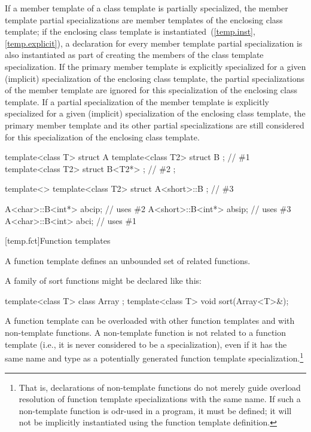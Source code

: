 \pnum
If a member template of a class template is partially specialized,
the member template partial specializations are member templates of
the enclosing class template;
if the enclosing class template is instantiated~(\ref{temp.inst}, \ref{temp.explicit}),
a declaration for every member template partial specialization is also
instantiated as part of creating the members of the class template
specialization.
If the primary member template is explicitly specialized for a given
(implicit) specialization of the enclosing class template,
the partial specializations of the member template are ignored for this
specialization of the enclosing class template.
If a partial specialization of the member template is explicitly specialized
for a given (implicit) specialization of the enclosing class template,
the primary member template and its other partial specializations are
still considered for this specialization of the enclosing class template.
\begin{example}

\begin{codeblock}
template<class T> struct A {
  template<class T2> struct B {};                     // \#1
  template<class T2> struct B<T2*> {};                // \#2
};

template<> template<class T2> struct A<short>::B {};  // \#3

A<char>::B<int*>  abcip;                              // uses \#2
A<short>::B<int*> absip;                              // uses \#3
A<char>::B<int>  abci;                                // uses \#1
\end{codeblock}
\end{example}

[temp.fct]{Function templates}

\pnum
A function template defines an unbounded set of related functions.
\begin{example}
A family of sort functions might be declared like this:

\begin{codeblock}
template<class T> class Array { };
template<class T> void sort(Array<T>&);
\end{codeblock}
\end{example}

\pnum
A function template can be overloaded with other function templates
and with non-template functions.
A non-template function is not
related to a function template
(i.e., it is never considered to be a specialization),
even if it has the same name and type
as a potentially generated function template specialization.\footnote{That is,
declarations of non-template functions do not merely guide
overload resolution of
function template specializations
with the same name.
If such a non-template function is odr-used in a program, it must be defined;
it will not be implicitly instantiated using the function template definition.}

